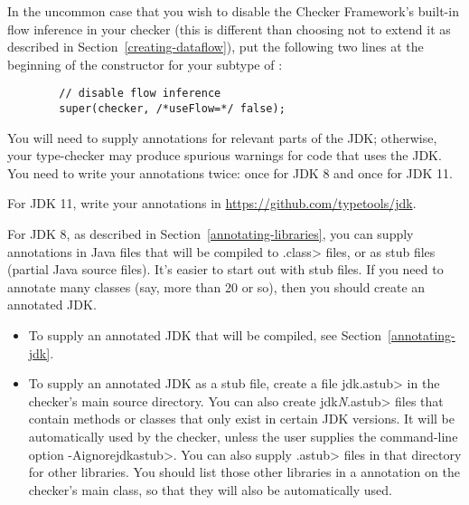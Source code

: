 
In the uncommon case that you wish to disable the Checker Framework's
built-in flow inference in your checker (this is different than choosing
not to extend it as described in Section~\ref{creating-dataflow}), put the
following two lines at the beginning of the constructor for your subtype of
:

\begin{Verbatim}
        // disable flow inference
        super(checker, /*useFlow=*/ false);
\end{Verbatim}



You will need to supply annotations for relevant parts of the JDK;
otherwise, your type-checker may produce spurious warnings for code that
uses the JDK\@.  You need to write your annotations twice:  once for JDK 8
and once for JDK 11.

For JDK 11, write your annotations in
\url{https://github.com/typetools/jdk}.

For JDK 8, as described in Section~\ref{annotating-libraries}, you can
supply annotations in Java files that will be compiled to \<.class> files,
or as stub files (partial Java source files).
It's easier to start out with stub files.  If you need to annotate many
classes (say, more than 20 or so), then you should create an annotated JDK.

\begin{itemize}
\item
To supply an annotated JDK that will be compiled, see Section~\ref{annotating-jdk}.
\item
To supply an annotated JDK as a stub file, create a file \<jdk.astub> in
the checker's main source directory.  You can also create \<jdk\emph{N}.astub> files that contain methods
or classes that only exist in certain JDK versions.
It will be automatically used by the
checker, unless the user supplies the command-line option \<-Aignorejdkastub>.
You can also supply \<.astub> files in that directory for other libraries.
You should list those other libraries in a
 annotation on the checker's main
class, so that they will also be automatically used.
\end{itemize}



